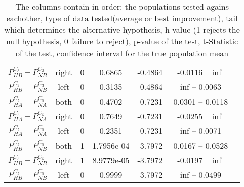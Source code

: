 \documentclass[../main.tex]{subfiles}
\begin{document}
\begin{table}
\begin{tabular}{ccccccc}
            $P^{C_3}_{HB}-P^{C_3}_{NB}$    & right & 0 & 0.6865    & -0.4864  & -0.0116 -- inf     \\
            $P^{C_3}_{HB}-P^{C_3}_{NB}$    & left  & 0 & 0.3135    & -0.4864  & -inf -- 0.0063     \\
            $P^{C_5}_{HA}-P^{C_5}_{NA}$    & both  & 0 & 0.4702    & -0.7231  & -0.0301 -- 0.0118  \\
            $P^{C_5}_{HA}-P^{C_5}_{NA}$    & right & 0 & 0.7649    & -0.7231  & -0.0255 -- inf     \\
            $P^{C_5}_{HA}-P^{C_5}_{NA}$    & left  & 0 & 0.2351    & -0.7231  & -inf -- 0.0071     \\
            $P^{C_5}_{HB}-P^{C_5}_{NB}$    & both  & 1 & 1.7956e-04& -3.7972  & -0.0167 -- 0.0528  \\
            $P^{C_5}_{HB}-P^{C_5}_{NB}$    & right & 1 & 8.9779e-05& -3.7972  & -0.0197 -- inf     \\
            $P^{C_5}_{HB}-P^{C_5}_{NB}$    & left  & 0 & 0.9999    & -3.7972  & -inf -- 0.0499     \\
        \hline
        \end{tabular}
    \caption*{The columns contain in order: the populations tested agains eachother, type of data tested(average or best improvement), tail which determines the alternative hypothesis, h-value (1 rejects the null hypothesis, 0 failure to reject), p-value of the test, t-Statistic of the test, confidence interval for the true population mean}
   \label{tab:tTest}
\end{table}
\end{document}
